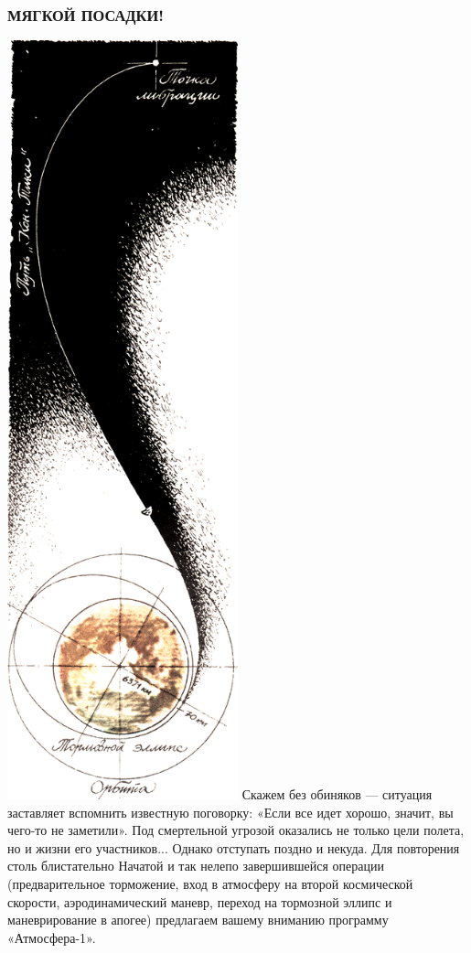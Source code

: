 \documentclass[11pt,a4paper,oneside]{article}
\begin{document}
\subsubsection{МЯГКОЙ ПОСАДКИ!}
\includegraphics[width=0.5\textwidth]{apogee2}
Скажем без обиняков — ситуация заставляет вспомнить известную поговорку: «Если все идет хорошо, значит, вы чего-то не заметили». Под смертельной угрозой оказались не только цели полета, но и жизни его участников... Однако отступать поздно и некуда. Для повторения столь блистательно Начатой и так нелепо завершившейся операции (предварительное торможение, вход в атмосферу на второй космической скорости, аэродинамический маневр, переход на тормозной эллипс и маневрирование в апогее) предлагаем вашему вниманию программу «Атмосфера-1».
\end{document}
